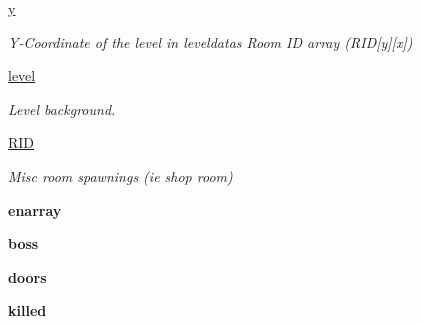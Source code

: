 \begin{DoxyCompactItemize}
\mbox{\label{classcollision_1_1levelmanager_1_1_level_manager_a5b6011487a9ea527e43194554dbf1326}} 
\hyperlink{classcollision_1_1levelmanager_1_1_level_manager_a5b6011487a9ea527e43194554dbf1326}{y}
\begin{DoxyCompactList}\small\item\em Y-\/\+Coordinate of the level in leveldata\textquotesingle{}s Room ID array (R\+ID\mbox{[}y\mbox{]}\mbox{[}x\mbox{]}) \end{DoxyCompactList}\item 
\mbox{\label{classcollision_1_1levelmanager_1_1_level_manager_ab209d49d600cc240e4faa3fa4a74c9f1}} 
\hyperlink{classcollision_1_1levelmanager_1_1_level_manager_ab209d49d600cc240e4faa3fa4a74c9f1}{level}
\begin{DoxyCompactList}\small\item\em Level background. \end{DoxyCompactList}\item 
\mbox{\label{classcollision_1_1levelmanager_1_1_level_manager_a7821297ccd39fd8cb2c2adec0eeaaf8f}} 
\hyperlink{classcollision_1_1levelmanager_1_1_level_manager_a7821297ccd39fd8cb2c2adec0eeaaf8f}{R\+ID}
\begin{DoxyCompactList}\small\item\em Misc room spawnings (ie shop room) \end{DoxyCompactList}\item 
\mbox{\label{classcollision_1_1levelmanager_1_1_level_manager_a28b8cccf02562bdc237c121e45c3a257}} 
{\bfseries enarray}
\item 
\mbox{\label{classcollision_1_1levelmanager_1_1_level_manager_a0f109f01f7dc8b59549e33af889da0ea}} 
{\bfseries boss}
\item 
\mbox{\label{classcollision_1_1levelmanager_1_1_level_manager_af88edf373a7c00e94164fccca24c07f3}} 
{\bfseries doors}
\item 
\mbox{\label{classcollision_1_1levelmanager_1_1_level_manager_a755ccaf64de0484a559d99ac313d2fc4}} 
{\bfseries killed}
\end{DoxyCompactItemize}
